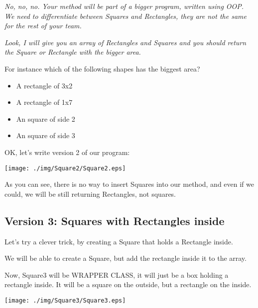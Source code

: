 \documentclass[a4paper, 9pt]{extarticle}
\begin{document}
\textsl{No, no, no. Your method will be part of a bigger program, written using
OOP. We need to differentiate between Squares and Rectangles, they are not the
same for the rest of your team.}

\textsl{Look, I will give you an array of Rectangles and Squares and you should
return the Square or Rectangle with the bigger area.}

For instance which of the following shapes has the biggest area?

\begin{itemize}
  \item A rectangle of 3x2
  \item A rectangle of 1x7
  \item An square of side 2
  \item An square of side 3
\end{itemize}

OK, let's write version 2 of our program:

\begin{multicols}{2}
\columnbreak
  \begin{center}
    \texttt{[image: ./img/Square2/Square2.eps]}
  \end{center}
\end{multicols}

As you can see, there is no way to insert Squares into our method, and even if
we could, we will be still returning Rectangles, not squares.

\newpage

\subsection{Version 3: Squares with Rectangles inside}

Let's try a clever trick, by creating a Square that holds a Rectangle inside.

We will be able to create a Square, but add the rectangle inside it to the
array.

Now, Square3 will be WRAPPER CLASS, it will just be a box holding a rectangle
inside. It will be a square on the outside, but a rectangle on the inside.

\begin{multicols}{2}
\columnbreak
  \begin{center}
    \texttt{[image: ./img/Square3/Square3.eps]}
  \end{center}
\end{multicols}
\end{document}

